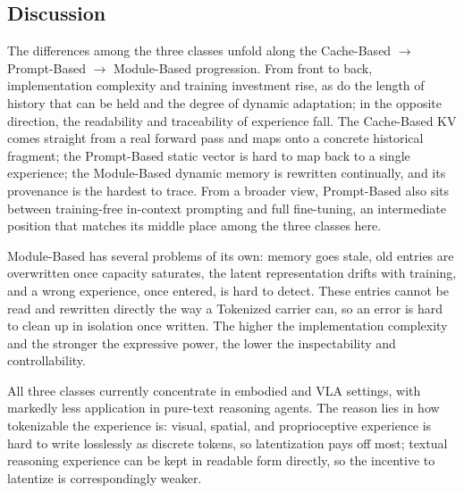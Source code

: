 \subsection{Discussion}

The differences among the three classes unfold along the Cache-Based $\rightarrow$ Prompt-Based $\rightarrow$ Module-Based progression. From front to back, implementation complexity and training investment rise, as do the length of history that can be held and the degree of dynamic adaptation; in the opposite direction, the readability and traceability of experience fall. The Cache-Based KV comes straight from a real forward pass and maps onto a concrete historical fragment; the Prompt-Based static vector is hard to map back to a single experience; the Module-Based dynamic memory is rewritten continually, and its provenance is the hardest to trace. From a broader view, Prompt-Based also sits between training-free in-context prompting and full fine-tuning, an intermediate position that matches its middle place among the three classes here.

Module-Based has several problems of its own: memory goes stale, old entries are overwritten once capacity saturates, the latent representation drifts with training, and a wrong experience, once entered, is hard to detect. These entries cannot be read and rewritten directly the way a Tokenized carrier can, so an error is hard to clean up in isolation once written. The higher the implementation complexity and the stronger the expressive power, the lower the inspectability and controllability.

All three classes currently concentrate in embodied and VLA settings, with markedly less application in pure-text reasoning agents. The reason lies in how tokenizable the experience is: visual, spatial, and proprioceptive experience is hard to write losslessly as discrete tokens, so latentization pays off most; textual reasoning experience can be kept in readable form directly, so the incentive to latentize is correspondingly weaker.
